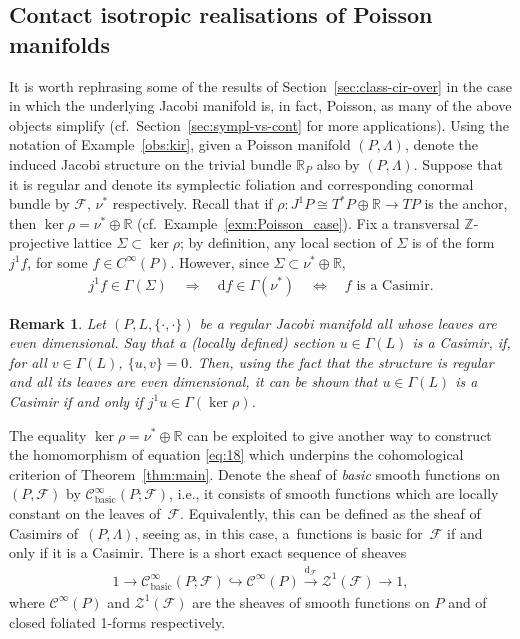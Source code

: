 \documentclass[pdftex]{sigma}
\numberwithin{equation}{section}
\newtheorem{Remark}[Theorem]{Remark} }
\newcommand{\de}{\mathrm{d}} %
\newcommand{\JM}{(P,L,\{\cdot,\cdot\})} %
\newcommand{\PM}{(P,\Lambda)} %
\newcommand{\RR}{\mathbb{R}}
\newcommand{\ZZ}{\mathbb{Z}}
\begin{document}
\subsection{Contact isotropic realisations of Poisson manifolds}\label{sec:cont-isotr-real-1}
It is worth rephrasing some of the results of Section~\ref{sec:class-cir-over} in the case in which the underlying Jacobi manifold is, in fact, Poisson, as many of the above objects simplify (cf.\ Section~\ref{sec:sympl-vs-cont} for more applications). Using the notation of Example~\ref{obs:kir}, given a Poisson manifold $\PM$, denote the induced Jacobi structure on the trivial bundle $\RR_P$ also by $\PM$. Suppose that it is regular and denote its symplectic foliation and corresponding conormal bundle by $\mathcal{F}$, $\nu^*$ respectively. Recall that if $\rho \colon J^1P \cong T^*P \oplus \RR \to TP$ is the anchor, then $\ker \rho = \nu^* \oplus \RR$ (cf.\ Example~\ref{exm:Poisson_case}). Fix a transversal $\ZZ$-projective lattice $\Sigma \subset \ker \rho$; by def\/inition, any local section of $\Sigma$ is of the form $j^1 f$, for some $f \in C^{\infty}(P)$. However, since $\Sigma \subset \nu^* \oplus \RR$,
\begin{gather} \label{eq:21}
 j^1 f \in \Gamma(\Sigma) \quad \Rightarrow \quad \de f \in \Gamma(\nu^*) \quad \Leftrightarrow \quad f \text{ is a Casimir}.
\end{gather}

\begin{Remark}\label{rk:general_ker_Casimir}
Let $\JM$ be a regular Jacobi manifold all whose leaves are even di\-men\-sio\-nal. Say that a (locally def\/ined) section $u \in \Gamma(L)$ is a {\it Casimir}, if, for all $v \in \Gamma(L)$, $\{u,v\}=0$. Then, using the fact that the structure is regular and all its leaves are even di\-men\-sio\-nal, it can be shown that $u \in \Gamma(L)$ is a Casimir if and only if $j^1u \in \Gamma(\ker \rho)$.
\end{Remark}

The equality $\ker \rho = \nu^* \oplus \RR$ can be exploited to give another way to construct the homomorphism of equation \eqref{eq:18} which underpins the cohomological criterion of Theorem~\ref{thm:main}. Denote the sheaf of {\it basic} smooth functions on~$(P,\mathcal{F})$ by $\mathcal{C}^{\infty}_{\mathrm{basic}}(P;\mathcal{F})$, i.e., it consists of smooth functions which are locally constant on the leaves of~$\mathcal{F}$. Equivalently, this can be def\/ined as the sheaf of Casimirs of~$\PM$, seeing as, in this case, a~functions is basic for~$\mathcal{F}$ if and only if it is a Casimir. There is a short exact sequence of sheaves
\begin{gather*}
 1 \to\mathcal{C}^{\infty}_{\mathrm{basic}}(P;\mathcal{F}) \hookrightarrow\mathcal{C}^{\infty} (P) \xrightarrow{\de_{\mathcal{F}}}\mathcal{Z}^1(\mathcal{F}) \to 1,
\end{gather*}
where $\mathcal{C}^{\infty} (P)$ and $\mathcal{Z}^1(\mathcal{F})$ are the sheaves of smooth functions on $P$ and of closed foliated 1-forms respectively.
\end{document}
